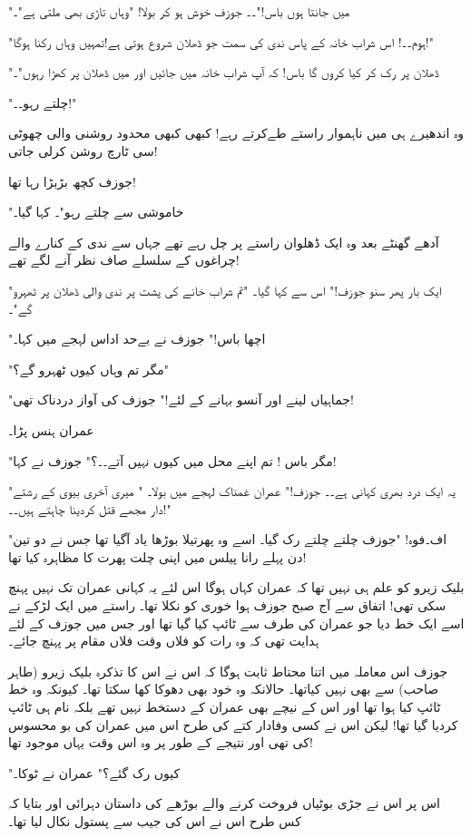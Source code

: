 "میں جانتا ہوں باس!"۔۔ جوزف خوش ہو کر بولا! "وہاں تاڑی بھی ملتی ہے"۔

"ہوم۔۔! اس شراب خانہ کے پاس ندی کی سمت جو ڈھلان شروع ہوتی ہے!تمہیں وہاں رکنا ہوگا!"

"ڈھلان پر رک کر کیا کروں گا باس! کہ آپ شراب خانہ میں جائیں اور میں ڈھلان پر کھڑا رہوں"۔

"چلتے رہو۔۔!"

وہ اندھیرے ہی میں ناہموار راستے طےکرتے رہے! کبھی کبھی محدود روشنی والی چھوٹی سی ٹارچ روشن کرلی جاتی!

جوزف کچھ بڑبڑا رہا تھا!

"خاموشی سے چلتے رہو"۔ کہا گیا۔

آدھے گھنٹے بعد وہ ایک ڈھلوان راستے پر چل رہے تھے جہاں سے ندی کے کنارے والے چراغوں کے سلسلے صاف نظر آنے لگے تھے!

"ایک بار پھر سنو جوزف!" اس سے کہا گیا۔ "تم شراب خانے کی پشت پر ندی والی ڈھلان پر ٹھہرو گے"۔

"اچھا باس!" جوزف نے بےحد اداس لہجے میں کہا۔

"مگر تم وہاں کیوں ٹھہرو گے؟"

"جماہیاں لینے اور آنسو بہانے کے لئے!" جوزف کی آواز دردناک تھی!

عمران ہنس پڑا۔

"مگر باس ! تم اپنے محل میں کیوں نہیں آتے۔۔؟" جوزف نے کہا!

"یہ ایک درد بھری کہانی ہے۔۔ جوزف!" عمران غمناک لہجے میں بولا۔ " میری آخری بیوی کے رشتے دار مجھے قتل کردینا چاہتے ہیں۔۔!"

"اف۔فوہ! "جوزف چلتے چلتے رک گیا۔ اسے وہ پھرتیلا بوڑھا یاد آگیا تھا جس نے دو تین دن پہلے رانا پیلس میں اپنی چلت پھرت کا مظاہرہ کیا تھا!

بلیک زیرو کو علم ہی نہیں تھا کہ عمران کہاں ہوگا اس لئے یہ کہانی عمران تک نہیں پہنچ سکی تھی! اتفاق سے آج صبح جوزف ہوا خوری کو نکلا تھا۔ راستے میں ایک لڑکے نے اسے ایک خط دیا جو عمران کی طرف سے ٹائپ کیا گیا تھا اور جس میں جوزف کے لئے ہدایت تھی کہ وہ رات کو فلاں وقت فلاں مقام پر پہنچ جائے۔

جوزف اس معاملہ میں اتنا محتاط ثابت ہوگا کہ اس نے اس کا تذکرہ بلیک زیرو (طاہر صاحب) سے بھی نہیں کیاتھا۔ حالانکہ وہ خود بھی دھوکا کھا سکتا تھا۔ کیونکہ وہ خط ٹائپ کیا ہوا تھا اور اس کے نیچے بھی عمران کے دستخط نہیں تھے بلکہ نام ہی ٹائپ کردیا گیا تھا! لیکن اس نے کسی وفادار کتے کی طرح اس میں عمران کی بو محسوس کی تھی اور نتیجے کے طور پر وہ اس وقت یہاں موجود تھا!

"کیوں رک گئے؟" عمران نے ٹوکا۔

اس پر اس نے جڑی بوٹیاں فروخت کرنے والے بوڑھے کی داستان دہرائی اور بتایا کہ کس طرح اس نے اس کی جیب سے پستول نکال لیا تھا۔

